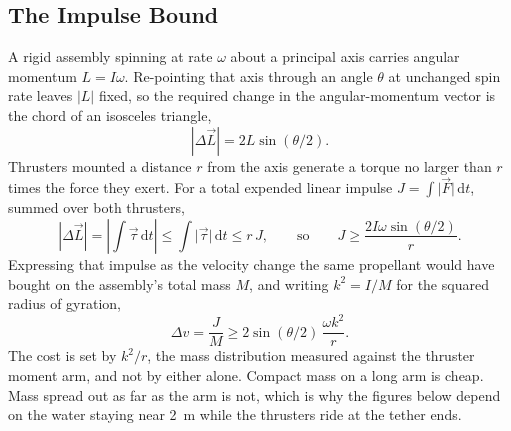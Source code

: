 \documentclass{article}
\newcommand{\deltav}{\Delta v}
\begin{document}
\subsection*{The Impulse Bound}
A rigid assembly spinning at rate \(\omega\) about a principal axis carries angular momentum \(L = I\omega\). Re-pointing that axis through an angle \(\theta\) at unchanged spin rate leaves \(|L|\) fixed, so the required change in the angular-momentum vector is the chord of an isosceles triangle,
\begin{equation}
\left|\Delta \vec{L}\right| = 2 L \sin(\theta/2).
\label{eq:reorient_chord}
\end{equation}
Thrusters mounted a distance \(r\) from the axis generate a torque no larger than \(r\) times the force they exert. For a total expended linear impulse \(J = \int \lvert\vec{F}\rvert\,\mathrm{d}t\), summed over both thrusters,
\begin{equation}
\left|\Delta \vec{L}\right| = \left|\int \vec{\tau}\,\mathrm{d}t\right| \le \int \lvert\vec{\tau}\rvert\,\mathrm{d}t \le r\,J,
\qquad\text{so}\qquad
J \ge \frac{2 I \omega \sin(\theta/2)}{r}.
\label{eq:reorient_bound}
\end{equation}
Expressing that impulse as the velocity change the same propellant would have bought on the assembly's total mass \(M\), and writing \(k^2 = I/M\) for the squared radius of gyration,
\begin{equation}
\deltav = \frac{J}{M} \ge 2\sin(\theta/2)\,\frac{\omega k^{2}}{r}.
\label{eq:reorient_dv}
\end{equation}
The cost is set by \(k^{2}/r\), the mass distribution measured against the thruster moment arm, and not by either alone. Compact mass on a long arm is cheap. Mass spread out as far as the arm is not, which is why the figures below depend on the water staying near \SI{2}{\meter} while the thrusters ride at the tether ends.
\end{document}
